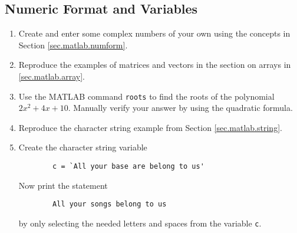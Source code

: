 \subsection{Numeric Format and Variables}
\begin{enumerate}
    \item Create and enter some complex numbers of your own using the concepts in Section \ref{sec.matlab.numform}.
    \item Reproduce the examples of matrices and vectors in the section on arrays in \nolinebreak[3] \ref{sec.matlab.array}.
    \item Use the MATLAB command \verb=roots= to find the roots of the polynomial $2x^2+4x+10$.  Manually verify your answer by using the quadratic formula.
    \item Reproduce the character string example from Section \nolinebreak[3] \ref{sec.matlab.string}.
    \item Create the character string variable
        \begin{verbatim}
        c = `All your base are belong to us'
        \end{verbatim}
        Now print the statement
        \begin{verbatim}
        All your songs belong to us
        \end{verbatim}
        by only selecting the needed letters and spaces from the variable \verb=c=.
\end{enumerate}

